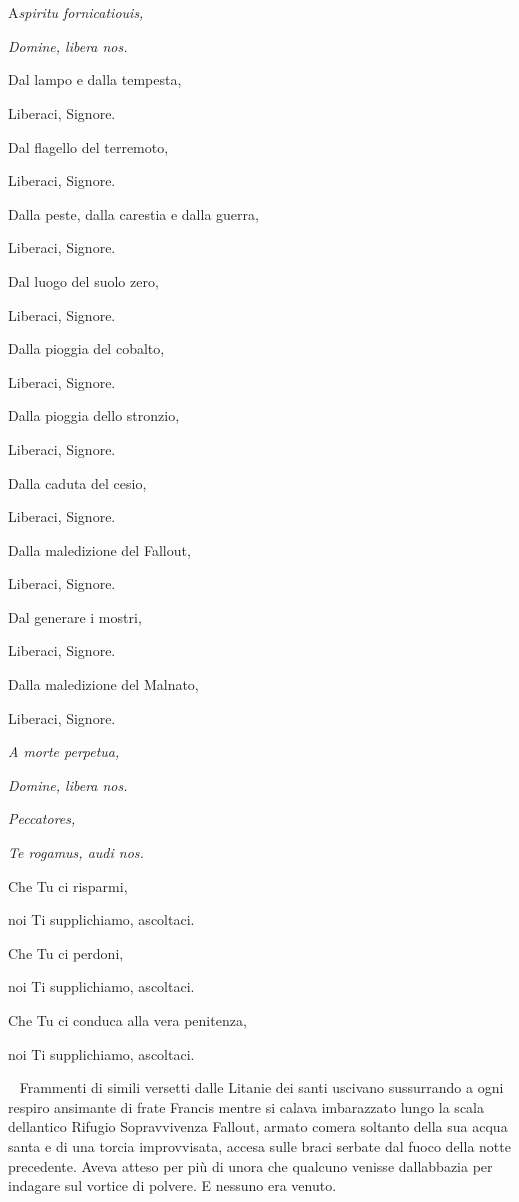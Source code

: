 \chapter{\phantom{title}}

\lettrine[nindent=0em, slope=-.5em, lraise=0.5]{A}{}\emph{spiritu fornicatiouis,}

\emph{Domine, libera nos.}

Dal lampo e dalla tempesta,

Liberaci, Signore.

Dal flagello del terremoto,

Liberaci, Signore.

Dalla peste, dalla carestia e dalla guerra,

Liberaci, Signore.

Dal luogo del suolo zero,

Liberaci, Signore.

Dalla pioggia del cobalto,

Liberaci, Signore.

Dalla pioggia dello stronzio,

Liberaci, Signore.

Dalla caduta del cesio,

Liberaci, Signore.

Dalla maledizione del Fallout,

Liberaci, Signore.

Dal generare i mostri,

Liberaci, Signore.

Dalla maledizione del Malnato,

Liberaci, Signore.

\emph{A morte perpetua,}

\emph{Domine, libera nos.}

\emph{Peccatores,}

\emph{Te rogamus, audi nos.}

Che Tu ci risparmi,

noi Ti supplichiamo, ascoltaci.

Che Tu ci perdoni,

noi Ti supplichiamo, ascoltaci.

Che Tu ci conduca alla vera penitenza,

noi Ti supplichiamo, ascoltaci.

~
Frammenti di simili versetti dalle Litanie dei santi uscivano
sussurrando a ogni respiro ansimante di frate Francis mentre si calava
imbarazzato lungo la scala dell\textquotesingle antico Rifugio
Sopravvivenza Fallout, armato com\textquotesingle era soltanto della sua
acqua santa e di una torcia improvvisata, accesa sulle braci serbate dal
fuoco della notte precedente. Aveva atteso per più di
un\textquotesingle ora che qualcuno venisse dall\textquotesingle abbazia
per indagare sul vortice di polvere. E nessuno era venuto.

